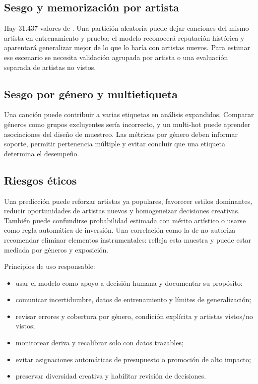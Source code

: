 \subsection{Sesgo y memorización por artista}

Hay 31.437 valores de . Una partición aleatoria puede dejar canciones del mismo artista
en entrenamiento y prueba; el modelo reconocerá reputación histórica y aparentará generalizar mejor
de lo que lo haría con artistas nuevos. Para estimar ese escenario se necesita validación agrupada por
artista o una evaluación separada de artistas no vistos.

\subsection{Sesgo por género y multietiqueta}

Una canción puede contribuir a varias etiquetas en análisis expandidos. Comparar géneros como grupos
excluyentes sería incorrecto, y un multi-hot puede aprender asociaciones del diseño de muestreo. Las
métricas por género deben informar soporte, permitir pertenencia múltiple y evitar concluir que una
etiqueta determina el desempeño.

\subsection{Riesgos éticos}

Una predicción puede reforzar artistas ya populares, favorecer estilos dominantes, reducir
oportunidades de artistas nuevos y homogeneizar decisiones creativas. También puede confundirse
probabilidad estimada con mérito artístico o usarse como regla automática de inversión. Una
correlación como la de  no autoriza recomendar eliminar elementos
instrumentales: refleja esta muestra y puede estar mediada por géneros y exposición.

Principios de uso responsable:

\begin{itemize}
\item usar el modelo como apoyo a decisión humana y documentar su propósito;
\item comunicar incertidumbre, datos de entrenamiento y límites de generalización;
\item revisar errores y cobertura por género, condición explícita y artistas vistos/no vistos;
\item monitorear deriva y recalibrar solo con datos trazables;
\item evitar asignaciones automáticas de presupuesto o promoción de alto impacto;
\item preservar diversidad creativa y habilitar revisión de decisiones.
\end{itemize}

